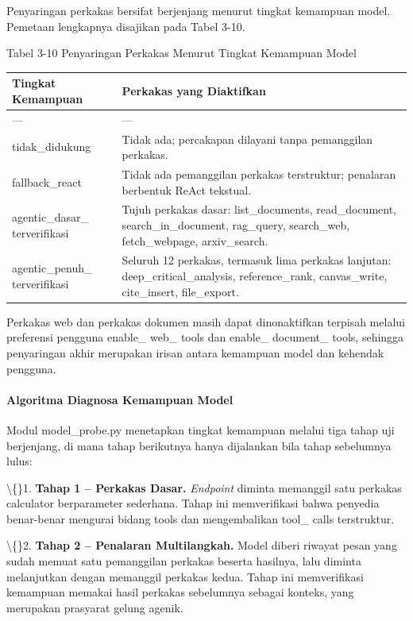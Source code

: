 \documentclass[12pt,a4paper]{article}
\begin{document}
Penyaringan perkakas bersifat berjenjang menurut tingkat kemampuan model. Pemetaan lengkapnya disajikan pada Tabel 3-10.

Tabel 3-10	Penyaringan Perkakas Menurut Tingkat Kemampuan Model

\begin{table}[h]
\centering
\begin{tabular}{ll}
\toprule
Tingkat Kemampuan & Perkakas yang Diaktifkan \\
\midrule
--- & --- \\
tidak\_didukung & Tidak ada; percakapan dilayani tanpa pemanggilan perkakas. \\
fallback\_react & Tidak ada pemanggilan perkakas terstruktur; penalaran berbentuk ReAct tekstual. \\
agentic\_dasar\_ terverifikasi & Tujuh perkakas dasar: list\_documents, read\_document, search\_in\_document, rag\_query, search\_web, fetch\_webpage, arxiv\_search. \\
agentic\_penuh\_ terverifikasi & Seluruh 12 perkakas, termasuk lima perkakas lanjutan: deep\_critical\_analysis, reference\_rank, canvas\_write, cite\_insert, file\_export. \\
\bottomrule
\end{tabular}
\end{table}
Perkakas web dan perkakas dokumen masih dapat dinonaktifkan terpisah melalui preferensi pengguna enable\_ web\_ tools dan enable\_ document\_ tools, sehingga penyaringan akhir merupakan irisan antara kemampuan model dan kehendak pengguna.

\paragraph*{Algoritma Diagnosa Kemampuan Model}
Modul model\_probe.py menetapkan tingkat kemampuan melalui tiga tahap uji berjenjang, di mana tahap berikutnya hanya dijalankan bila tahap sebelumnya lulus:

\textbackslash\{\}1. \textbf{Tahap 1 -- Perkakas Dasar.} \textit{Endpoint} diminta memanggil satu perkakas calculator berparameter sederhana. Tahap ini memverifikasi bahwa penyedia benar-benar mengurai bidang tools dan mengembalikan tool\_ calls terstruktur.

\textbackslash\{\}2. \textbf{Tahap 2 -- Penalaran Multilangkah.} Model diberi riwayat pesan yang sudah memuat satu pemanggilan perkakas beserta hasilnya, lalu diminta melanjutkan dengan memanggil perkakas kedua. Tahap ini memverifikasi kemampuan memakai hasil perkakas sebelumnya sebagai konteks, yang merupakan prasyarat gelung agenik.
\end{document}
